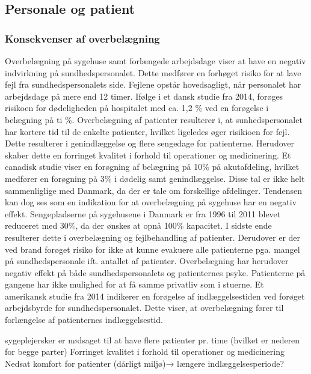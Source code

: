 \subsection{Personale og patient}

\subsubsection{Konsekvenser af overbelægning}

Overbelægning på sygehuse samt forlængede arbejdsdage viser at have en negativ indvirkning på sundhedspersonalet. Dette medfører en forhøget risiko for at lave fejl fra sundhedspersonalets side. Fejlene opstår hovedsagligt, når personalet har arbejdsdage på mere end 12 timer.\citep{forogelse2004} Ifølge i et dansk studie fra 2014, forøges risikoen for dødeligheden på hospitalet med ca. 1,2 \% ved en forøgelse i belægning på ti \%.\citep{dodelighed2014} Overbelægning af patienter resulterer i, at sunhedspersonalet har kortere tid til de enkelte patienter, hvilket ligeledes øger risikioen for fejl. Dette resulterer i genindlæggelse og flere sengedage for patienterne. Herudover skaber dette en forringet kvalitet i forhold til operationer og medicinering. Et canadisk studie viser en forøgning af belægning på 10\% på akutafdeling, hvilket medfører en forøgning på 3\% i dødelig samt genindlæggelse.\citep{genind2014} Disse tal er ikke helt sammenliglige med Danmark, da der er tale om forskellige afdelinger. Tendensen kan dog ses som en indikation for at overbelægning på sygehuse har en negativ effekt.
Sengepladserne på sygehusene i Danmark er fra 1996 til 2011 blevet reduceret med 30\%, da der ønskes at opnå 100\% kapacitet.\citep{dodelighed2014} I sidste ende resulterer dette i overbelægning og fejlbehandling af patienter. Derudover er der ved brand forøget risiko for ikke at kunne evakuere alle patienterne pga. mangel på sundhedspersonale ift. antallet af patienter. 
Overbelægning har herudover negativ effekt på både sundhedspersonalets og patienternes psyke. Patienterne på gangene har ikke mulighed for at få samme privatliv som i stuerne.\citep{dodelighed2014}  Et amerikansk studie fra 2014 indikerer en forøgelse af indlæggelsestiden ved forøget arbejdsbyrde for sundhedspersonalet\citep{forlang2014}. Dette viser, at overbelægning fører til forlængelse af patienternes indlæggelsestid. 


sygeplejersker er nødsaget til at have flere patienter pr. time (hvilket er nederen for begge parter)
Forringet kvalitet i forhold til operationer og medicinering 
Nedsat komfort for patienter (dårligt miljø)→ længere indlæggelsesperiode?
 

